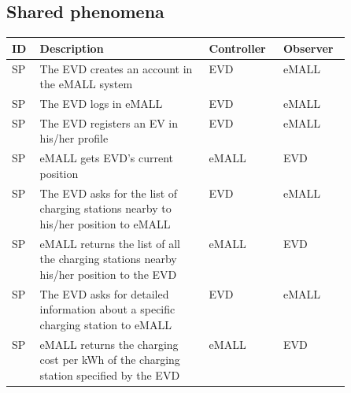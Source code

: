 \subsection{Shared phenomena}
\label{subsec:shared_phenomena}%
\setcounter{sp}{1}
\newcommand{\csp} {\thesp\stepcounter{sp}}
\begin{center}
    \begin{longtable}{ |l|p{0.5\linewidth}|l|l| }
        \hline
        \textbf{ID} & \textbf{Description}                                                                                                        & \textbf{Controller} & \textbf{Observer} \\
        \hline
        SP\csp      & The EVD creates an account in the eMALL system                                                                              & EVD                 & eMALL             \\
        \hline
        SP\csp      & The EVD logs in eMALL                                                                                                       & EVD                 & eMALL             \\
        \hline
        SP\csp      & The EVD registers an EV in his/her profile                                                                                  & EVD                 & eMALL             \\
        \hline
        SP\csp      & eMALL gets EVD's current position                                                                                           & eMALL               & EVD               \\
        \hline
        SP\csp      & The EVD asks for the list of charging stations nearby to his/her position to eMALL                                        & EVD                 & eMALL             \\
        \hline
        SP\csp      & eMALL returns the list of all the charging stations nearby his/her position to the EVD                                    & eMALL               & EVD               \\
        \hline
        SP\csp      & The EVD asks for detailed information about a specific charging station to eMALL                                          & EVD                 & eMALL             \\
        \hline
        SP\csp      & eMALL returns the charging cost per kWh of the charging station specified by the EVD                                      & eMALL               & EVD               \\

\end{longtable}
\end{center}
